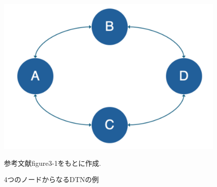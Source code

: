 \begin{figure}[tbh]
    \centering
    \includegraphics[width=0.5\textheight]{img/contact_example_topology.pdf}
    \caption{4つのノードからなるDTNの例}
    \label{fig:contact_example_topology}
    \begin{minipage}{\textwidth}
        \centering
        \vspace{3mm}
        参考文献\cite{schedule_aware_bundle_routing}figure3-1をもとに作成. 
    \end{minipage}
\end{figure}
